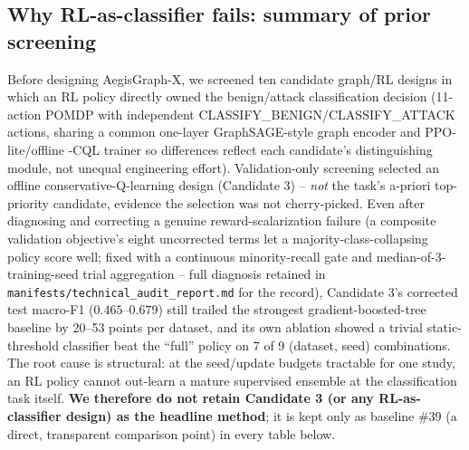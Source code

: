 \documentclass[journal]{IEEEtran}
\begin{document}
\subsection{Why RL-as-classifier fails: summary of prior screening}
\label{sec:method_history}
Before designing AegisGraph-X, we screened ten candidate graph/RL designs in
which an RL policy directly owned the benign/attack classification decision
(11-action POMDP with independent CLASSIFY\_BENIGN/CLASSIFY\_ATTACK actions,
sharing a common one-layer GraphSAGE-style graph encoder and PPO-lite/offline
-CQL trainer so differences reflect each candidate's distinguishing module,
not unequal engineering effort). Validation-only screening selected an
offline conservative-Q-learning design (Candidate 3) -- \emph{not} the
task's a-priori top-priority candidate, evidence the selection was not
cherry-picked. Even after diagnosing and correcting a genuine reward-scalarization
failure (a composite validation objective's eight uncorrected terms let a
majority-class-collapsing policy score well; fixed with a continuous
minority-recall gate and median-of-3-training-seed trial aggregation -- full
diagnosis retained in \texttt{manifests/technical\_audit\_report.md} for the
record), Candidate 3's corrected test macro-F1 ($0.465$--$0.679$) still
trailed the strongest gradient-boosted-tree baseline by 20--53 points per
dataset, and its own ablation showed a trivial static-threshold classifier
beat the ``full'' policy on 7 of 9 (dataset, seed) combinations. The root
cause is structural: at the seed/update budgets tractable for one study, an
RL policy cannot out-learn a mature supervised ensemble at the classification
task itself. \textbf{We therefore do not retain Candidate 3 (or any
RL-as-classifier design) as the headline method}; it is kept only as baseline
\#39 (a direct, transparent comparison point) in every table below.
\end{document}

